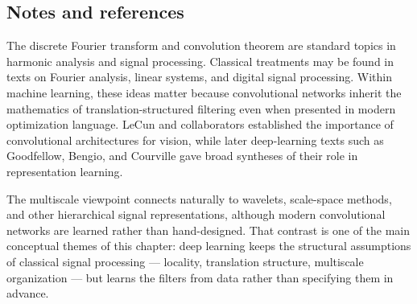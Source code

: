 \subsection*{Notes and references}

The discrete Fourier transform and convolution theorem are standard topics in harmonic analysis and signal processing.
Classical treatments may be found in texts on Fourier analysis, linear systems, and digital signal processing.
Within machine learning, these ideas matter because convolutional networks inherit the mathematics of translation-structured filtering even when presented in modern optimization language.
LeCun and collaborators established the importance of convolutional architectures for vision, while later deep-learning texts such as Goodfellow, Bengio, and Courville gave broad syntheses of their role in representation learning.

\medskip

The multiscale viewpoint connects naturally to wavelets, scale-space methods, and other hierarchical signal representations, although modern convolutional networks are learned rather than hand-designed.
That contrast is one of the main conceptual themes of this chapter:
deep learning keeps the structural assumptions of classical signal processing --- locality, translation structure, multiscale organization --- but learns the filters from data rather than specifying them in advance.

